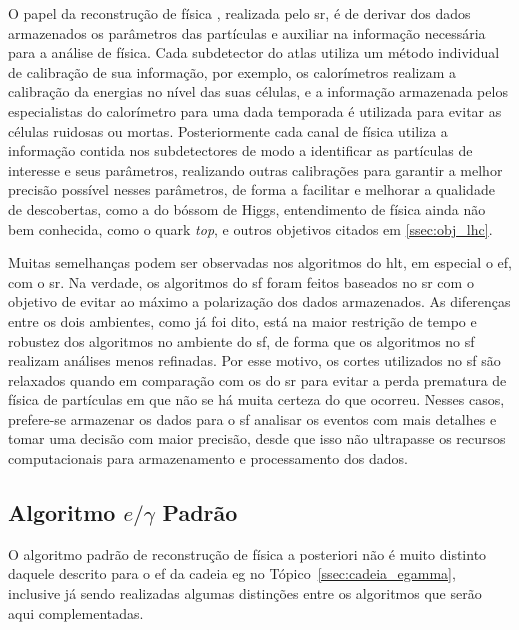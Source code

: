 O papel da reconstrução de física \cite{physics_perf_expected,atlas_computing_tdr}, 
realizada pelo \gls{sr}, é de derivar dos dados armazenados os parâmetros das partículas 
e auxiliar na informação necessária para a análise de física. 
Cada subdetector do \gls{atlas} utiliza um método individual de calibração de
sua informação, por exemplo, os calorímetros realizam a calibração da energias no
nível das suas células, e a informação armazenada pelos especialistas do
calorímetro para uma dada temporada é utilizada para evitar as células ruidosas ou mortas. 
Posteriormente cada canal de física utiliza a informação contida nos
subdetectores de modo a identificar as partículas de interesse e seus
parâmetros, realizando outras calibrações para garantir a melhor precisão
possível nesses parâmetros, de forma a facilitar e melhorar a qualidade de
descobertas, como a do bóssom de Higgs, entendimento de física ainda não bem
conhecida, como o quark \emph{top}, e outros objetivos citados em
\ref{ssec:obj_lhc}.

Muitas semelhanças podem ser observadas nos algoritmos do \gls{hlt}, em especial o
\gls{ef}, com o \gls{sr}. Na verdade, os algoritmos do \gls{sf} foram feitos
baseados no \gls{sr} com o objetivo de evitar ao máximo a polarização dos dados
armazenados. As diferenças entre os dois ambientes, como já foi dito, está na
maior restrição de tempo e robustez dos algoritmos no ambiente do \gls{sf}, de
forma que os algoritmos no \gls{sf} realizam análises menos refinadas. Por esse
motivo, os cortes utilizados no \gls{sf} são relaxados quando em comparação com
os do \gls{sr} para evitar a perda prematura de física de partículas em que não
se há muita certeza do que ocorreu. Nesses casos, prefere-se armazenar os
dados para o \gls{sf} analisar os eventos com mais detalhes e tomar uma decisão
com maior precisão, desde que isso não ultrapasse os recursos computacionais para 
armazenamento e processamento dos dados.

\subsection{\texorpdfstring{Algoritmo $e/\gamma$ Padrão}{Algoritmo eGamma Padrão}}
\label{ssec:egamma}

O algoritmo padrão de reconstrução de física a posteriori não é muito distinto
daquele descrito para o \gls{ef} da cadeia \gls{eg} no Tópico~\ref{ssec:cadeia_egamma},
inclusive já sendo realizadas algumas distinções entre os algoritmos que serão
aqui complementadas.


